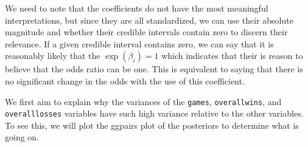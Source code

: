 \documentclass[10pt,a4paper, hidelinks]{article} %
\begin{document}
\begin{table}[ht]
\begin{tabular}{lrrrrrrr}
		\bottomrule
	\end{tabular}
\end{table}


We need to note that the coefficients do not have the most meaningful interpretations, but since they are all standardized, we can use their absolute magnitude and whether their credible intervals contain zero to discern their relevance. If a given credible interval contains zero, we can say that it is reasonably likely that the $\exp(\beta_i) = 1$ which indicates that their is reason to believe that the odds ratio can be one. This is equivalent to saying that there is no significant change in the odds with the use of this coefficient. 

We first aim to explain why the variances of the \texttt{games}, \texttt{overallwins}, and \texttt{overalllosses} variables have such high variance relative to the other variables. To see this, we will plot the ggpairs plot of the posteriors to determine what is going on.
\end{document}
